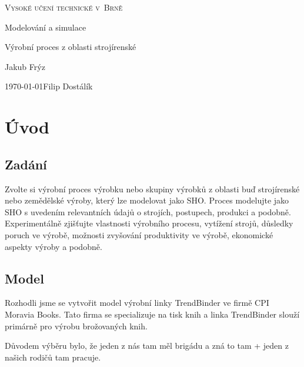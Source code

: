 \documentclass[a4paper, 11pt]{article}
\begin{document}
\begin{titlepage}
\begin{center}

\textsc{{\Huge Vysoké učení technické v~Brně}\\}



{\LARGE Modelování a simulace}
\medskip

{\Huge Výrobní proces z oblasti strojírenské}



{\Large \hfill Jakub Frýz}

\smallskip

{\Large \today \hfill Filip Dostálík}

\end{center}
\end{titlepage}

\tableofcontents
\pagebreak

\section{Úvod}

\subsection{Zadání}

Zvolte si výrobní proces výrobku nebo skupiny výrobků z oblasti buď strojírenské nebo zemědělské výroby, který lze modelovat jako SHO. Proces modelujte jako SHO s uvedením relevantních údajů o strojích, postupech, produkci a podobně. Experimentálně zjišťujte vlastnosti výrobního procesu, vytížení strojů, důsledky poruch ve výrobě, možnosti zvyšování produktivity ve výrobě, ekonomické aspekty výroby a podobně.

\subsection{Model}

Rozhodli jsme se vytvořit model výrobní linky TrendBinder ve firmě CPI Moravia Books. Tato firma se specializuje na tisk knih a linka TrendBinder  slouží primárně pro výrobu brožovaných knih.

Důvodem výběru bylo, že jeden z nás tam měl brigádu a zná to tam + jeden z našich rodičů tam pracuje.
\end{document}
